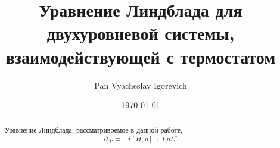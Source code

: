 \documentclass[a4paper,10pt]{article}
\title{Уравнение Линдблада для двухуровневой системы, взаимодействующей с термостатом}
\author{Pan Vyacheslav Igorevich}
\date{\today}
\begin{document}
\maketitle
    \begin{abstract}
        Уравнение Линдблада, рассматривоемое в данной работе, 
        $$\partial_t\rho = -i[H,\rho] + L\rho L^{\dagger}$$
    \end{abstract}
\end{document}
